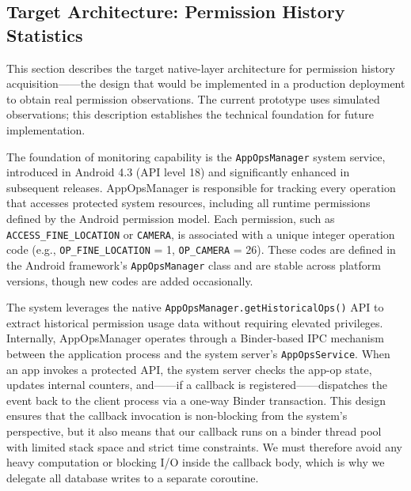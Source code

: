 \subsection{Target Architecture: Permission History Statistics}

This section describes the target native-layer architecture for permission history acquisition——the design that would be implemented in a production deployment to obtain real permission observations. The current prototype uses simulated observations; this description establishes the technical foundation for future implementation.

The foundation of monitoring capability is the \texttt{AppOpsManager} system service, introduced in Android 4.3 (API level 18) and significantly enhanced in subsequent releases. AppOpsManager is responsible for tracking every operation that accesses protected system resources, including all runtime permissions defined by the Android permission model. Each permission, such as \texttt{ACCESS\_FINE\_LOCATION} or \texttt{CAMERA}, is associated with a unique integer operation code (e.g., \texttt{OP\_FINE\_LOCATION} = 1, \texttt{OP\_CAMERA} = 26). These codes are defined in the Android framework's \texttt{AppOpsManager} class and are stable across platform versions, though new codes are added occasionally.

The system leverages the native \texttt{AppOpsManager.getHistoricalOps()} API to extract historical permission usage data without requiring elevated privileges. Internally, AppOpsManager operates through a Binder-based IPC mechanism between the application process and the system server's \texttt{AppOpsService}. When an app invokes a protected API, the system server checks the app-op state, updates internal counters, and——if a callback is registered——dispatches the event back to the client process via a one-way Binder transaction. This design ensures that the callback invocation is non-blocking from the system's perspective, but it also means that our callback runs on a binder thread pool with limited stack space and strict time constraints. We must therefore avoid any heavy computation or blocking I/O inside the callback body, which is why we delegate all database writes to a separate coroutine.


